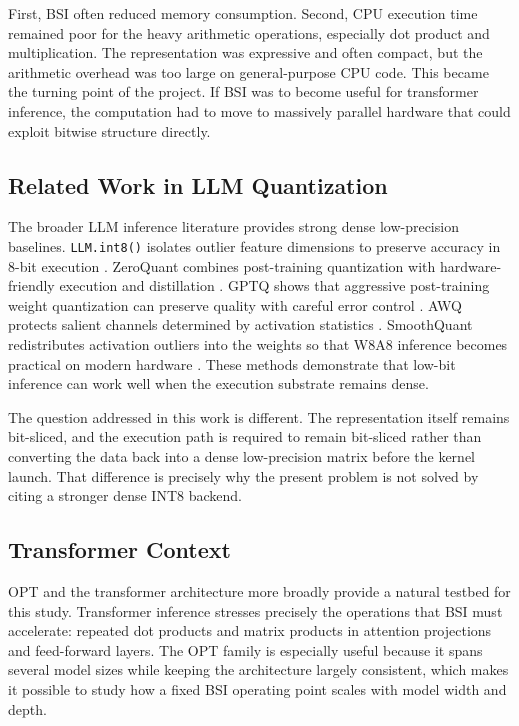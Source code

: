 First, BSI often reduced memory consumption. Second, CPU execution time remained poor for the heavy arithmetic operations, especially dot product and multiplication. The representation was expressive and often compact, but the arithmetic overhead was too large on general-purpose CPU code. This became the turning point of the project. If BSI was to become useful for transformer inference, the computation had to move to massively parallel hardware that could exploit bitwise structure directly.

\subsection{Related Work in LLM Quantization}
The broader LLM inference literature provides strong dense low-precision baselines. \texttt{LLM.int8()} isolates outlier feature dimensions to preserve accuracy in 8-bit execution \cite{llmint8}. ZeroQuant combines post-training quantization with hardware-friendly execution and distillation \cite{zeroquant}. GPTQ shows that aggressive post-training weight quantization can preserve quality with careful error control \cite{gptq}. AWQ protects salient channels determined by activation statistics \cite{awq}. SmoothQuant redistributes activation outliers into the weights so that W8A8 inference becomes practical on modern hardware \cite{smoothquant}. These methods demonstrate that low-bit inference can work well when the execution substrate remains dense.

The question addressed in this work is different. The representation itself remains bit-sliced, and the execution path is required to remain bit-sliced rather than converting the data back into a dense low-precision matrix before the kernel launch. That difference is precisely why the present problem is not solved by citing a stronger dense INT8 backend.

\subsection{Transformer Context}
OPT \cite{opt} and the transformer architecture more broadly \cite{attention} provide a natural testbed for this study. Transformer inference stresses precisely the operations that BSI must accelerate: repeated dot products and matrix products in attention projections and feed-forward layers. The OPT family is especially useful because it spans several model sizes while keeping the architecture largely consistent, which makes it possible to study how a fixed BSI operating point scales with model width and depth.

